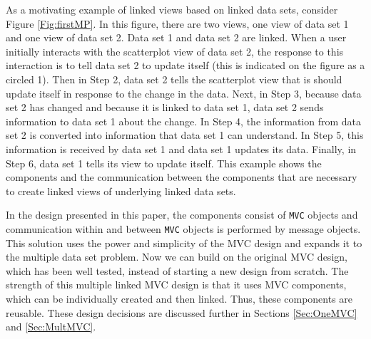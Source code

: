 \documentclass{article}[11pt]
\newcommand{\Robject}[1]{{\texttt{#1}}}
\begin{document}
As a motivating example of linked views based on linked data sets, consider
Figure \ref{Fig:firstMP}.  In this figure, there are two views, one view of
data set 1 and one view of data set 2.  Data set 1 and data set 2 are linked.
When a user initially interacts with the scatterplot view of data set 2, the
response to this interaction is to tell data set 2 to update itself (this is
indicated on the figure as a circled 1).  Then in Step 2, data set 2 tells the
scatterplot view that is should update itself in response to the change in the
data.  Next, in Step 3, because data set 2 has changed and because it is
linked to data set 1, data set 2 sends information to data set 1 about the
change.  In Step 4, the information from data set 2 is converted into
information that data set 1 can understand.  In Step 5, this information is
received by data set 1 and data set 1 updates its data.  Finally, in Step 6,
data set 1 tells its view to update itself.  This example shows the components
and the communication between the components that are necessary to create
linked views of underlying linked data sets.  

In the design presented in this paper, the components consist of \Robject{MVC}
objects and communication within and between \Robject{MVC} objects is
performed by message objects.  This solution uses the power and simplicity of
the MVC design and expands it to the multiple data set problem.  Now we can
build on the original MVC design, which has been well tested, instead of
starting a new design from scratch.  The strength of this multiple linked MVC
design is that it uses MVC components, which can be individually created and
then linked.  Thus, these components are reusable.  These design decisions are
discussed further in Sections \ref{Sec:OneMVC} and \ref{Sec:MultMVC}. 

\end{document}
